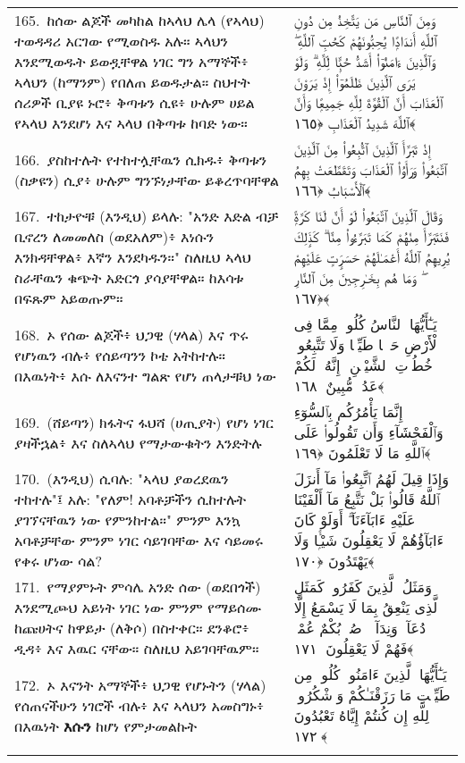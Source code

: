 \documentclass[11pt,a4paper,oneside]{article}%
\newcommand{\mytextarabic}[1]{\textarabic{ #1 \flushright}}
\begin{document}
\begin{longtable}{%
  @{}
    p{}
  @{~~~}
    p{}
    @{}
}
165.\ ከሰው ልጆች መካከል ከኣላህ ሌላ (የኣላህ) ተወዳዳሪ አርገው የሚወስዱ አሉ። ኣላህን እንደሚወዱት ይወዷቸዋል ነገር ግን አማኞች፥ ኣላህን (ከማንም) የበለጠ ይወዱታል። ስህተት ሰሪዎች ቢያዩ ኑሮ፥ ቅጣቱን ሲዩ፥ ሁሉም ሀይል የኣላህ እንደሆነ እና ኣላህ በቅጣቱ ከባድ ነው። &  \mytextarabic{وَمِنَ ٱلنَّاسِ مَن يَتَّخِذُ مِن دُونِ ٱللَّهِ أَندَادًۭا يُحِبُّونَهُمْ كَحُبِّ ٱللَّهِ ۖ وَٱلَّذِينَ ءَامَنُوٓا۟ أَشَدُّ حُبًّۭا لِّلَّهِ ۗ وَلَوْ يَرَى ٱلَّذِينَ ظَلَمُوٓا۟ إِذْ يَرَوْنَ ٱلْعَذَابَ أَنَّ ٱلْقُوَّةَ لِلَّهِ جَمِيعًۭا وَأَنَّ ٱللَّهَ شَدِيدُ ٱلْعَذَابِ ﴿١٦٥﴾}\\
166.\ ያስከተሉት የተከተሏቸዉን ሲክዱ፥ ቅጣቱን (ስቃዩን) ሲያ፥ ሁሉም ግንኙነታቸው ይቆረጥባቸዋል &  \mytextarabic{إِذْ تَبَرَّأَ ٱلَّذِينَ ٱتُّبِعُوا۟ مِنَ ٱلَّذِينَ ٱتَّبَعُوا۟ وَرَأَوُا۟ ٱلْعَذَابَ وَتَقَطَّعَتْ بِهِمُ ٱلْأَسْبَابُ ﴿١٦٦﴾}\\
167.\ ተከታዮቹ (እንዲህ) ይላሉ: "አንድ እድል ብቻ ቢኖረን ለመመለስ (ወደአለም)፥ እነሱን እንክዳቸዋል፥ እኛን እንደካዱን።" ስለዚህ ኣላህ ስራቸዉን ቁጭት አድርጎ ያሳያቸዋል። ከእሳቱ በፍጹም አይወጡም። &  \mytextarabic{ وَقَالَ ٱلَّذِينَ ٱتَّبَعُوا۟ لَوْ أَنَّ لَنَا كَرَّةًۭ فَنَتَبَرَّأَ مِنْهُمْ كَمَا تَبَرَّءُوا۟ مِنَّا ۗ كَذَٟلِكَ يُرِيهِمُ ٱللَّهُ أَعْمَـٰلَهُمْ حَسَرَٟتٍ عَلَيْهِمْ ۖ وَمَا هُم بِخَـٰرِجِينَ مِنَ ٱلنَّارِ ﴿١٦٧﴾}\\
168.\ ኦ የሰው ልጆች፥ ህጋዊ (ሃላል) እና ጥሩ የሆነዉን ብሉ፥ የሰይጣንን ኮቴ አትከተሉ። በእዉነት፥ እሱ ለእናንተ ግልጽ የሆነ ጠላታቹህ ነው &  \mytextarabic{يَـٰٓأَيُّهَا ٱلنَّاسُ كُلُوا۟ مِمَّا فِى ٱلْأَرْضِ حَلَٟلًۭا طَيِّبًۭا وَلَا تَتَّبِعُوا۟ خُطُوَٟتِ ٱلشَّيْطَٟنِ ۚ إِنَّهُۥ لَكُمْ عَدُوٌّۭ مُّبِينٌ ﴿١٦٨﴾}\\
169.\ (ሸይጣን) ክፋትና ፋህሻ (ሀጢያት) የሆነ ነገር ያዛችኋል፥ እና ስለኣላህ የማታውቁትን እንድትሉ &  \mytextarabic{ إِنَّمَا يَأْمُرُكُم بِٱلسُّوٓءِ وَٱلْفَحْشَآءِ وَأَن تَقُولُوا۟ عَلَى ٱللَّهِ مَا لَا تَعْلَمُونَ ﴿١٦٩﴾}\\
170.\ (እንዲህ) ሲባሉ: "ኣላህ ያወረደዉን ተከተሉ"፤ አሉ: "የለም! አባቶቻችን ሲከተሉት ያገኘናቸዉን ነው የምንከተል።" ምንም እንኳ አባቶቻቸው ምንም ነገር ሳይገባቸው እና ሳይመሩ የቀሩ ሆነው ሳል? &  \mytextarabic{وَإِذَا قِيلَ لَهُمُ ٱتَّبِعُوا۟ مَآ أَنزَلَ ٱللَّهُ قَالُوا۟ بَلْ نَتَّبِعُ مَآ أَلْفَيْنَا عَلَيْهِ ءَابَآءَنَآ ۗ أَوَلَوْ كَانَ ءَابَآؤُهُمْ لَا يَعْقِلُونَ شَيْـًۭٔا وَلَا يَهْتَدُونَ ﴿١٧٠﴾}\\
171.\ የማያምኑት ምሳሌ አንድ ሰው (ወደበጎች) እንደሚጮህ አይነት ነገር ነው ምንም የማይሰሙ ከጩሀትና ከዋይታ (ለቅሶ) በስተቀር። ደንቆሮ፥ ዲዳ፥ እና እዉር ናቸው። ስለዚህ አይገባቸዉም። &  \mytextarabic{ وَمَثَلُ ٱلَّذِينَ كَفَرُوا۟ كَمَثَلِ ٱلَّذِى يَنْعِقُ بِمَا لَا يَسْمَعُ إِلَّا دُعَآءًۭ وَنِدَآءًۭ ۚ صُمٌّۢ بُكْمٌ عُمْىٌۭ فَهُمْ لَا يَعْقِلُونَ ﴿١٧١﴾}\\
172.\ ኦ እናንት አማኞች፥ ህጋዊ የሆኑትን (ሃላል) የሰጠናችሁን ነገሮች ብሉ፥ እና ኣላህን አመስግኑ፥ በእዉነት  {\bf እሱን} ከሆነ የምታመልኩት &  \mytextarabic{ يَـٰٓأَيُّهَا ٱلَّذِينَ ءَامَنُوا۟ كُلُوا۟ مِن طَيِّبَٟتِ مَا رَزَقْنَـٰكُمْ وَٱشْكُرُوا۟ لِلَّهِ إِن كُنتُمْ إِيَّاهُ تَعْبُدُونَ ﴿١٧٢﴾}\\\\

\end{longtable}
\end{document}
